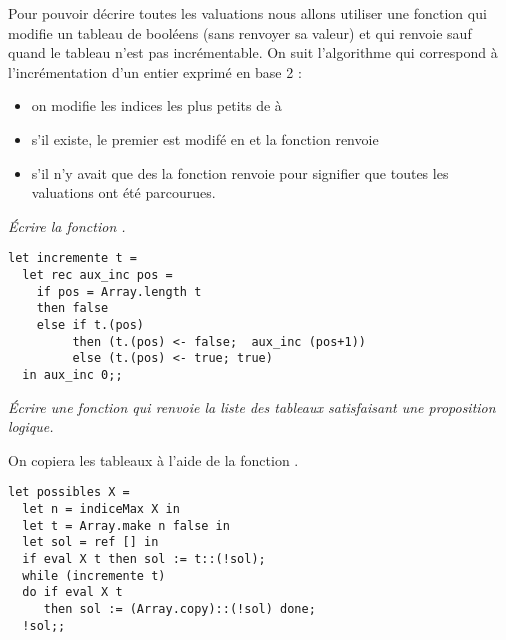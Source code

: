 Pour pouvoir décrire toutes les valuations nous allons utiliser une fonction  qui modifie un tableau de booléens (sans renvoyer sa valeur) et qui renvoie  sauf quand le tableau n'est pas incrémentable. On suit l'algorithme qui correspond à l'incrémentation d'un entier exprimé en base 2 :
\begin{itemize}
\item on modifie les indices les plus petits de  à 
\item s'il existe, le premier  est modifé en  et la fonction renvoie 
\item s'il n'y avait que des  la fonction renvoie  pour signifier que toutes les valuations ont été parcourues.
\end{itemize}
\begin{Exercise}\it
Écrire la fonction .
\end{Exercise}
\begin{Answer}
\begin{lstlisting}
let incremente t =
  let rec aux_inc pos =
    if pos = Array.length t
    then false
    else if t.(pos)
         then (t.(pos) <- false;  aux_inc (pos+1))
         else (t.(pos) <- true; true)
  in aux_inc 0;;       
\end{lstlisting}
\end{Answer}
\begin{Exercise}\it 
Écrire une fonction  qui renvoie la liste des tableaux satisfaisant une proposition logique. 

On copiera les tableaux à l’aide de la fonction .
\end{Exercise}
\begin{Answer}
\begin{lstlisting}
let possibles X =
  let n = indiceMax X in
  let t = Array.make n false in
  let sol = ref [] in
  if eval X t then sol := t::(!sol);
  while (incremente t)
  do if eval X t
     then sol := (Array.copy)::(!sol) done;
  !sol;;
\end{lstlisting}
\end{Answer}
